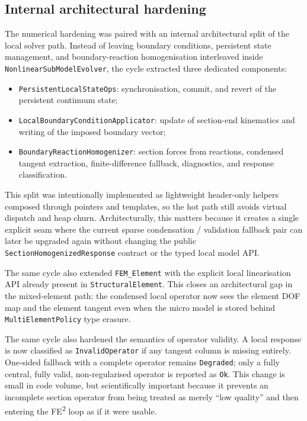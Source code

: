 \subsection{Internal architectural hardening}

The numerical hardening was paired with an internal architectural split of the
local solver path.  Instead of leaving boundary conditions, persistent state
management, and boundary-reaction homogenisation interleaved inside
\texttt{NonlinearSubModelEvolver}, the cycle extracted three dedicated
components:
\begin{itemize}
  \item \texttt{PersistentLocalStateOps}: synchronisation, commit, and revert
    of the persistent continuum state;
  \item \texttt{LocalBoundaryConditionApplicator}: update of section-end
    kinematics and writing of the imposed boundary vector;
  \item \texttt{BoundaryReactionHomogenizer}: section forces from reactions,
    condensed tangent extraction, finite-difference fallback, diagnostics, and
    response classification.
\end{itemize}

This split was intentionally implemented as lightweight header-only helpers
composed through pointers and templates, so the hot path still avoids virtual
dispatch and heap churn.  Architecturally, this matters because it creates a
single explicit seam where the current sparse condensation / validation
fallback pair can later be upgraded again without changing the public
\texttt{SectionHomogenizedResponse} contract or the typed local model API.

The same cycle also extended \texttt{FEM\_Element} with the explicit local
linearisation API already present in \texttt{StructuralElement}.  This closes
an architectural gap in the mixed-element path: the condensed local operator
now sees the element DOF map and the element tangent even when the micro model
is stored behind \texttt{MultiElementPolicy} type erasure.

The same cycle also hardened the semantics of operator validity.  A local
response is now classified as \texttt{InvalidOperator} if any tangent column is
missing entirely.  One-sided fallback with a complete operator remains
\texttt{Degraded}; only a fully central, fully valid, non-regularised operator
is reported as \texttt{Ok}.  This change is small in code volume, but
scientifically important because it prevents an incomplete section operator
from being treated as merely ``low quality'' and then entering the FE\textsuperscript{2}
loop as if it were usable.

